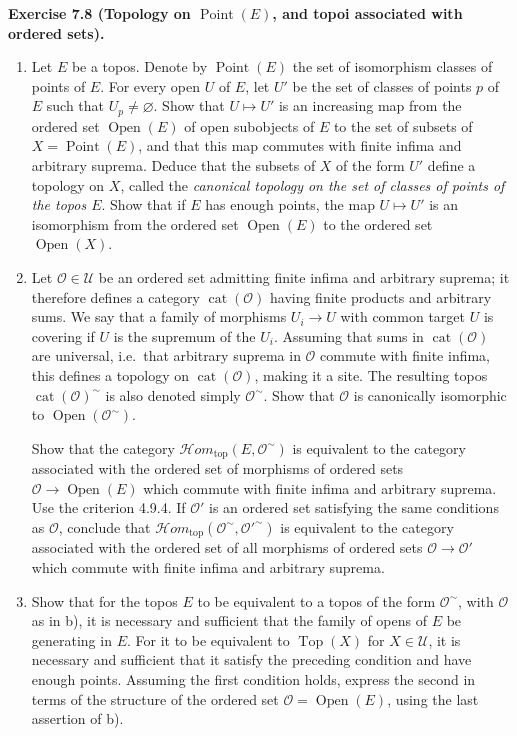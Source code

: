 \documentclass[11pt]{article}
\newcommand{\U}{\mathcal{U}}
\newcommand{\Top}{\operatorname{Top}}
\newcommand{\Hhomtop}{\mathcal{H}om_{\mathrm{top}}}
\newcommand{\ie}{i.e.}
\newenvironment{remarktext}[1]{\par\medskip\noindent\textbf{#1.}\ }{\par\medskip}
\providecommand{\Oo}{\mathcal{O}}
\providecommand{\Ouv}{\operatorname{Open}}
\providecommand{\Point}{\operatorname{Point}}
\providecommand{\cat}{\operatorname{cat}}
\begin{document}
\begin{remarktext}{Exercise 7.8 (Topology on \(\Point(E)\), and topoi associated with ordered sets)}
\begin{enumerate}[label=\alph*)]
\item Let \(E\) be a topos. Denote by \(\Point(E)\) the set of isomorphism classes of points of \(E\). For every open \(U\) of \(E\), let \(U'\) be the set of classes of points \(p\) of \(E\) such that \(U_p\ne\varnothing\). Show that \(U\mapsto U'\) is an increasing map from the ordered set \(\Ouv(E)\) of open subobjects of \(E\) to the set of subsets of \(X=\Point(E)\), and that this map commutes with finite infima and arbitrary suprema. Deduce that the subsets of \(X\) of the form \(U'\) define a topology on \(X\), called the \emph{canonical topology on the set of classes of points of the topos \(E\)}. Show that if \(E\) has enough points, the map \(U\mapsto U'\) is an isomorphism from the ordered set \(\Ouv(E)\) to the ordered set \(\Ouv(X)\).

\item Let \(\Oo\in\U\) be an ordered set admitting finite infima and arbitrary suprema; it therefore defines a category \(\cat(\Oo)\) having finite products and arbitrary sums. We say that a family of morphisms \(U_i\to U\) with common target \(U\) is covering if \(U\) is the supremum of the \(U_i\). Assuming that sums in \(\cat(\Oo)\) are universal, \ie\ that arbitrary suprema in \(\Oo\) commute with finite infima, this defines a topology on \(\cat(\Oo)\), making it a site. The resulting topos \(\cat(\Oo)^{\sim}\) is also denoted simply \(\Oo^{\sim}\). Show that \(\Oo\) is canonically isomorphic to \(\Ouv(\Oo^{\sim})\).

Show that the category \(\Hhomtop(E,\Oo^{\sim})\) is equivalent to the category associated with the ordered set of morphisms of ordered sets \(\Oo\to\Ouv(E)\) which commute with finite infima and arbitrary suprema. Use the criterion 4.9.4. If \(\Oo'\) is an ordered set satisfying the same conditions as \(\Oo\), conclude that \(\Hhomtop(\Oo^{\sim},{\Oo'}^{\sim})\) is equivalent to the category associated with the ordered set of all morphisms of ordered sets \(\Oo\to\Oo'\) which commute with finite infima and arbitrary suprema.

\item Show that for the topos \(E\) to be equivalent to a topos of the form \(\Oo^{\sim}\), with \(\Oo\) as in b), it is necessary and sufficient that the family of opens of \(E\) be generating in \(E\). For it to be equivalent to \(\Top(X)\) for \(X\in\U\), it is necessary and sufficient that it satisfy the preceding condition and have enough points. Assuming the first condition holds, express the second in terms of the structure of the ordered set \(\Oo=\Ouv(E)\), using the last assertion of b).


\end{enumerate}
\end{remarktext}
\end{document}

